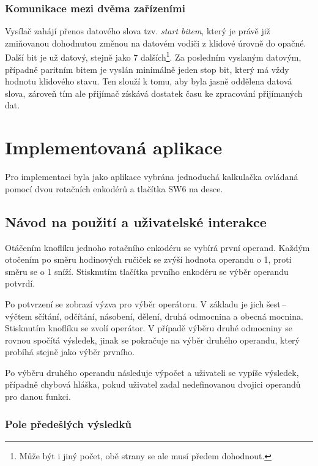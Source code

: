 \documentclass[a4paper, 11pt]{article}
\begin{document}
\subsubsection{Komunikace mezi dvěma zařízeními}\label{1_2_1:komunikace}

Vysílač zahájí přenos datového slova tzv. \emph{start bitem}, který je právě již zmiňovanou dohodnutou změnou na datovém vodiči z klidové úrovně do opačné.
Další bit je už datový, stejně jako 7 dalších\footnote{Může být i jiný počet, obě strany se ale musí předem dohodnout.}. Za posledním vyslaným datovým, případně paritním bitem je vyslán minimálně jeden stop bit, který má vždy hodnotu klidového stavu. Ten slouží k tomu, aby byla jasně oddělena datová slova, zároveň tím ale přijímač získává dostatek času ke zpracování přijímaných dat.

\section{Implementovaná aplikace}\label{2:aplikace}

Pro implementaci byla jako aplikace vybrána jednoduchá kalkulačka ovládaná pomocí dvou rotačních enkodérů a tlačítka SW6 na desce.

\subsection{Návod na použití a uživatelské interakce}\label{2_1:navod}

Otáčením knoflíku jednoho rotačního enkodéru se vybírá první operand.
Každým otočením po směru hodinových ručiček se zvýší hodnota operandu o 1, proti směru se o 1 sníží.
Stisknutím tlačítka prvního enkodéru se výběr operandu potvrdí.

Po potvrzení se zobrazí výzva pro výběr operátoru. V základu je jich šest\,--\,výčtem sčítání, odčítání, násobení, dělení, druhá odmocnina a obecná mocnina.
Stisknutím knoflíku se zvolí operátor.
V případě výběru druhé odmocniny se rovnou spočítá výsledek, jinak se pokračuje na výběr druhého operandu, který probíhá stejně jako výběr prvního.

Po výběru druhého operandu následuje výpočet a uživateli se vypíše výsledek, případně chybová hláška, pokud uživatel zadal nedefinovanou dvojici operandů pro danou funkci.

\subsubsection{Pole předešlých výsledků}\label{2_1_1:predesle_vysledky}
\end{document}
